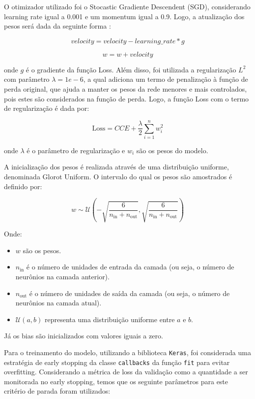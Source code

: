 \documentclass[]{abntex2}
\begin{document}
O otimizador utilizado foi o Stocastic Gradiente Descendent (SGD), considerando learning rate igual a 0.001 e um momentum igual a 0.9. Logo, a atualização dos pesos será dada da seguinte forma \cite{keras}:

\[
velocity = velocity - learning\_rate * g 
\]

\[
w = w + velocity
\]

onde \(g\) é o gradiente da função Loss. Além disso, foi utilizada a regularização \( L^2 \) com parâmetro \(\lambda = 1e-6\), a qual adiciona um termo de penalização à função de perda original, que ajuda a manter os pesos da rede menores e mais controlados, pois estes são considerados na função de perda. Logo, a função Loss com o termo de regularização é dada por:

\[
\text{Loss} = CCE + \dfrac{\lambda}{2} \sum_{i=1}^{n} w_i^2
\]

onde \(\lambda\) é o parâmetro de regularização e \(w_i\) são os pesos do modelo. 

A inicialização dos pesos é realizada através de uma distribuição uniforme, denominada Glorot Uniform. O intervalo do qual os pesos são amostrados é definido por:

\[
w \sim \mathcal{U}\left(-\sqrt{\frac{6}{n_{\text{in}} + n_{\text{out}}}}, \sqrt{\frac{6}{n_{\text{in}} + n_{\text{out}}}}\right)
\]

Onde:
\begin{itemize}
    \item \( w \) são os pesos.
    \item \( n_{\text{in}} \) é o número de unidades de entrada da camada (ou seja, o número de neurônios na camada anterior).
    \item \( n_{\text{out}} \) é o número de unidades de saída da camada (ou seja, o número de neurônios na camada atual).
    \item \( \mathcal{U}(a, b) \) representa uma distribuição uniforme entre \( a \) e \( b \).
\end{itemize}

Já os bias são inicializados com valores iguais a zero.

Para o treinamento do modelo, utilizando a biblioteca \texttt{Keras}, foi considerada uma estratégia de early stopping da classe \texttt{callbacks} da função \texttt{fit} para evitar overfitting. Considerando a métrica de loss da validação como a quantidade a ser monitorada no early stopping, temos que os seguinte parâmetros para este critério de parada foram utilizados:
\end{document}
